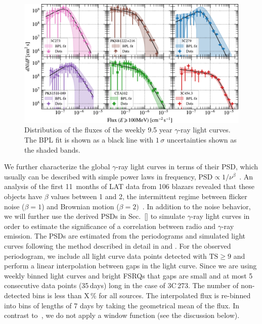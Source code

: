 \documentclass[twocolumn]{aastex62}
\newcommand{\gray}{$\gamma$-ray\xspace}
\begin{document}
\begin{figure}
    \includegraphics[width = .99\linewidth]{figures/fluxdist_weekly_tsmin9.pdf}
    \caption{\label{fig:fluxpdf} Distribution of the fluxes of the weekly 9.5 year \gray light curves. The BPL fit is shown as a black line with $1\,\sigma$ uncertainties shown as the shaded bands.}
\end{figure}

We further characterize the global \gray light curves in terms of their PSD,
which usually can be described with simple power laws in frequency,  $\mathrm{PSD} \propto 1 / \nu^\beta$~\citep{}.
An analysis of the first 11~months of LAT data from 106 blazars revealed that 
these objects have $\beta$ values between 1 and 2, the intermittent regime between flicker noise ($\beta = 1$) and Brownian motion ($\beta = 2)$~\citep{2010ApJ...722..520A}. 
In addition to the noise behavior, 
we will further use the derived PSDs in Sec.~\ref{} to simulate \gray light curves in order to estimate the significance of a correlation between radio and \gray emission. 
The PSDs are estimated from the periodograms and simulated light curves following the method described in detail in \citet{2014MNRAS.445..437M} and \citet{2013MNRAS.433..907E}.
For the observed periodogram, we include all light curve data points detected with $\mathrm{TS} \geqslant 9$ and perform a linear interpolation between gaps in the light curve. Since we are using weekly binned light curves and bright FSRQs that gaps are small and at most 5 consecutive data points (35\,days) long in the case of 3C\,273. The number of non-detected bins is less than X\,\% for all sources.
The interpolated flux is re-binned into bins of lengths of 7 days by taking the geometrical mean of the flux. 
In contrast to~\citet{2014MNRAS.445..437M}, we do not apply a window function (see the discussion below). 
\end{document}

